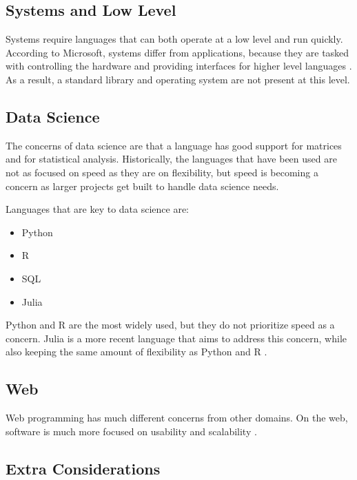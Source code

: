 \documentclass[12pt, oneside, a4paper]{book}
\begin{document}
         \subsection{Systems and Low Level}
         Systems require languages that can both operate at a low level and run quickly.
         According to Microsoft, systems differ from applications, because they are tasked with controlling the hardware and providing interfaces for higher level languages \autocite{microsoftPanelSystemsProgramming2014}.
         As a result, a standard library and operating system are not present at this level.

         \subsection{Data Science}
         The concerns of data science are that a language has good support for matrices and for statistical analysis.
         Historically, the languages that have been used are not as focused on speed as they are on flexibility, but speed is becoming a concern as larger projects get built to handle data science needs.

         Languages that are key to data science are:
         \begin{itemize}
            \item Python
            \item R
            \item SQL
            \item Julia
         \end{itemize} \autocite{MostPopularLanguages}

         Python and R are the most widely used, but they do not prioritize speed as a concern.
         Julia is a more recent language that aims to address this concern, while also keeping the same amount of flexibility as Python and R \autocite{MostPopularLanguages}.

         \subsection{Web}
         Web programming has much different concerns from other domains.
         On the web, software is much more focused on usability and scalability \autocite{siiaSoftwareServiceChanging2004}.

         \subsection{Extra Considerations}
         
\end{document}
